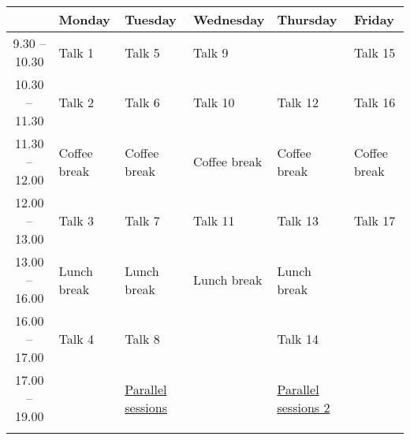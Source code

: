 \documentclass[a4paper]{article}
\begin{document}
\begin{landscape}
	\def\arraystretch{1.8}%
	\begin{table}[htbp]
	\large
	\begin{tabularx}{1.3\linewidth}{| c | X | X | X | X | X |}
		\hline
    			       & \textbf{Monday}     & \textbf{Tuesday}	 & \textbf{Wednesday} & \textbf{Thursday} & \textbf{Friday}\\ \hline
	      	 9.30 -- 10.30 & {Talk 1}            & {Talk 5}		 & {Talk 9}	      &                   &  {Talk 15}     \\ \hline
		10.30 -- 11.30 & {Talk 2}            & {Talk 6}		 & {Talk 10}  	      &   {Talk 12}       & {Talk 16}       \\ \hline
		11.30 -- 12.00 & Coffee break        & Coffee break 	 & Coffee break       & Coffee break      & Coffee break   \\ \hline
		12.00 -- 13.00 & {Talk 3}            & {Talk 7}  	 & {Talk 11}          &  {Talk 13}         &  {Talk 17}      \\ \hline
		13.00 -- 16.00 & Lunch break 	     & Lunch break       & Lunch break        & Lunch break       &                \\ \hline
		16.00 -- 17.00 & {Talk 4}  	     & {Talk 8}          &                    & {Talk 14}         &   		   \\ \hline
		17.00 -- 19.00 &  &\hyperlink{short1}{Parallel sessions}\hypertarget{bS1}{} & & \hyperlink{short2}{Parallel sessions 2} \hypertarget{bS2}{}& \\ \hline
			       & & & &  &\\ \hline
	\end{tabularx}
	\end{table}
	\normalsize
	\restoregeometry
\end{landscape}
\pagebreak
\end{document}
